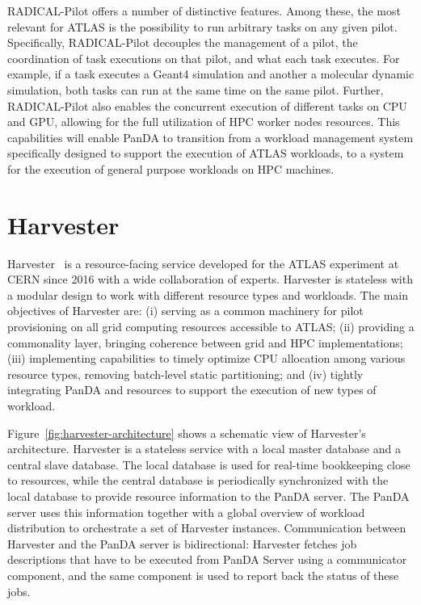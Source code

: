 \documentclass{webofc}
\begin{document}
RADICAL-Pilot offers a number of distinctive features. Among these, the most
relevant for ATLAS is the possibility to run arbitrary tasks on any given
pilot. Specifically, RADICAL-Pilot decouples the management of a pilot, the
coordination of task executions on that pilot, and what each task executes.
For example, if a task executes a Geant4 simulation and another a molecular
dynamic simulation, both tasks can run at the same time on the same pilot.
Further, RADICAL-Pilot also enables the concurrent execution of different
tasks on CPU and GPU, allowing for the full utilization of HPC worker nodes
resources. This capabilities will enable PanDA to transition from a workload
management system specifically designed to support the execution of ATLAS
workloads, to a system for the execution of general purpose workloads on HPC
machines.


\section{Harvester}

Harvester~\cite{Harvester} is a resource-facing service developed for the
ATLAS experiment at CERN since 2016 with a wide collaboration of experts.
Harvester is stateless with a modular design to work with different resource
types and workloads. The main objectives of Harvester are: (i) serving as a
common machinery for pilot provisioning on all grid computing resources
accessible to ATLAS; (ii) providing a commonality layer, bringing coherence
between grid and HPC implementations; (iii) implementing capabilities to
timely optimize CPU allocation among various resource types, removing
batch-level static partitioning; and (iv) tightly integrating PanDA and
resources to support the execution of new types of workload.

Figure~\ref{fig:harvester-architecture} shows a schematic view of Harvester's
architecture. Harvester is a stateless service with a local master database
and a central slave database. The local database is used for real-time
bookkeeping close to resources, while the central database is periodically
synchronized with the local database to provide resource information to the
PanDA server. The PanDA server uses this information together with a global
overview of workload distribution to orchestrate a set of Harvester
instances. Communication between Harvester and the PanDA server is
bidirectional: Harvester fetches job descriptions that have to be executed
from PanDA Server using a communicator component, and the same component is
used to report back the status of these jobs.
\end{document}
